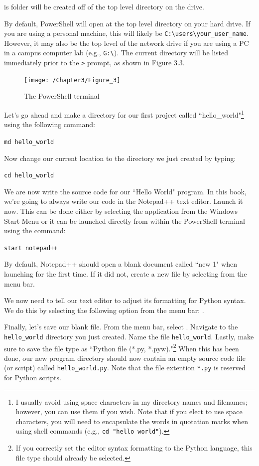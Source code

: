 \documentclass{book}
\begin{document}
is folder will be created off of the top level directory on the drive. 

By default, PowerShell will open at the top level directory on your hard drive. If you are using a personal machine, this will likely be \texttt{C:\textbackslash users\textbackslash your\_user\_name}. However, it may also be the top level of the network drive if you are using a PC in a campus computer lab (e.g., \texttt{G:\textbackslash}). The current directory will be listed immediately prior to the \texttt{>} prompt, as shown in Figure 3.3.

\begin{figure}[h]
	\caption{The PowerShell terminal}
	\centering\texttt{[image: /Chapter3/Figure\_3]}
\end{figure}

Let's go ahead and make a directory for our first project called ``hello\_world"\footnote{I usually avoid using space characters in my directory names and filenames; however, you can use them if you wish. Note that if you elect to use space characters, you will need to encapsulate the words in quotation marks when using shell commands (e.g., \texttt{cd "hello world"}).} using the following command:

\texttt{md hello\_world}

Now change our current location to the directory we just created by typing:

\texttt{cd hello\_world}

We are now write the source code for our ``Hello World" program. In this book, we're going to always write our code in the Notepad++ text editor. Launch it now. This can be done either by selecting the application from the Windows Start Menu or it can be launched directly from within the PowerShell terminal using the command:

\texttt{start notepad++}

By default, Notepad++ should open a blank document called ``new 1" when launching for the first time. If it did not, create a new file by selecting  from the menu bar. 

We now need to tell our text editor to adjust its formatting for Python syntax. We do this by selecting the following option from the menu bar: . 

Finally, let's save our blank file. From the menu bar, select . Navigate to the \texttt{hello\_world} directory you just created. Name the file \texttt{hello\_world}. Lastly, make sure to save the file type as ``Python file (*.py, *.pyw)."\footnote{If you correctly set the editor syntax formatting to the Python language, this file type should already be selected.} When this has been done, our new program directory should now contain an empty source code file (or script) called \texttt{hello\_world.py}. Note that the file extention \texttt{*.py} is reserved for Python scripts.
\end{document}

